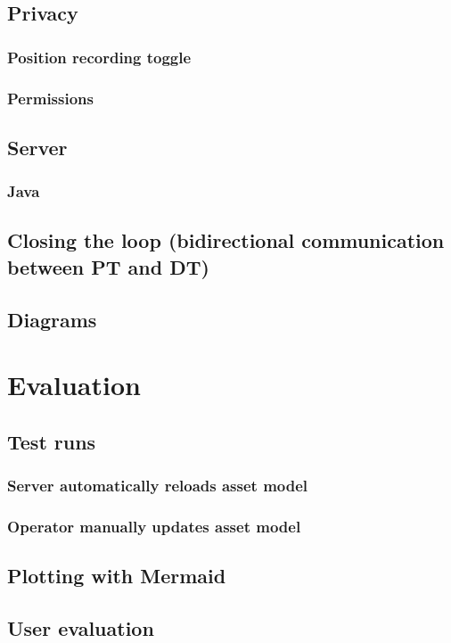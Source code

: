 \documentclass{article}
\begin{document}
\subsection{Privacy}
\subsubsection{Position recording toggle}
\subsubsection{Permissions}
\subsection{Server}
\subsubsection{Java}
\subsection{Closing the loop (bidirectional communication between PT and DT)}
\subsection{Diagrams}



\newpage
\section{Evaluation}\label{sec:Evaluation}
\subsection{Test runs}
\subsubsection{Server automatically reloads asset model}
\subsubsection{Operator manually updates asset model}
\subsection{Plotting with Mermaid}
\subsection{User evaluation}
\end{document}
